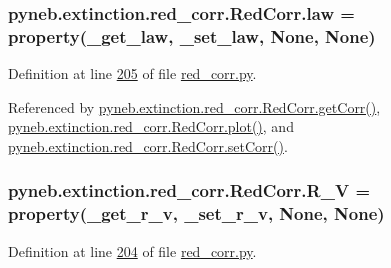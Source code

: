 \begin{DoxyVerb}
\hypertarget{classpyneb_1_1extinction_1_1red__corr_1_1_red_corr_adfed423013315bad4ba5dda2368dc3d0}{
\subsubsection[{law}]{\setlength{\rightskip}{0pt plus 5cm}pyneb.\-extinction.\-red\-\_\-corr.\-Red\-Corr.\-law = property({\bf \-\_\-get\-\_\-law}, {\bf \-\_\-set\-\_\-law}, None, None)\hspace{0.3cm}{\ttfamily [static]}}}\label{classpyneb_1_1extinction_1_1red__corr_1_1_red_corr_adfed423013315bad4ba5dda2368dc3d0}


Definition at line \hyperlink{red__corr_8py_source_l00205}{205} of file \hyperlink{red__corr_8py_source}{red\-\_\-corr.\-py}.



Referenced by \hyperlink{red__corr_8py_source_l00211}{pyneb.\-extinction.\-red\-\_\-corr.\-Red\-Corr.\-get\-Corr()}, \hyperlink{red__corr_8py_source_l00303}{pyneb.\-extinction.\-red\-\_\-corr.\-Red\-Corr.\-plot()}, and \hyperlink{red__corr_8py_source_l00281}{pyneb.\-extinction.\-red\-\_\-corr.\-Red\-Corr.\-set\-Corr()}.

\hypertarget{classpyneb_1_1extinction_1_1red__corr_1_1_red_corr_a4696ecdd84c912c20e6aa19b1573e875}{
\subsubsection[{R\-\_\-\-V}]{\setlength{\rightskip}{0pt plus 5cm}pyneb.\-extinction.\-red\-\_\-corr.\-Red\-Corr.\-R\-\_\-\-V = property({\bf \-\_\-get\-\_\-r\-\_\-v}, {\bf \-\_\-set\-\_\-r\-\_\-v}, None, None)\hspace{0.3cm}{\ttfamily [static]}}}\label{classpyneb_1_1extinction_1_1red__corr_1_1_red_corr_a4696ecdd84c912c20e6aa19b1573e875}


Definition at line \hyperlink{red__corr_8py_source_l00204}{204} of file \hyperlink{red__corr_8py_source}{red\-\_\-corr.\-py}.




\end{DoxyVerb}

